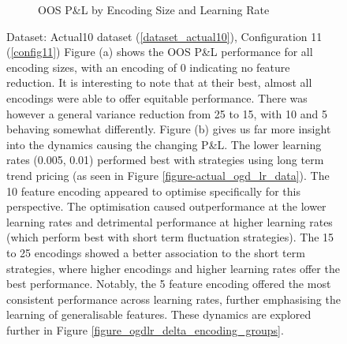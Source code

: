 \documentclass[a4paper,11pt,oneside]{article}
\theoremstyle{plain}
\theoremstyle{definition}
\begin{document}
\begin{figure}[H]
\begin{subfigure}{1.0\linewidth}
			\caption[OOS P\&L by Encoding Size and Learning Rate]{OOS P\&L by Encoding Size and Learning Rate}
		\end{subfigure}	
		\caption[OOS P\&L By Feature Selection Size and OGD Learning Rate]
		{Dataset: Actual10 dataset (\ref{dataset_actual10}), Configuration 11 (\ref{config11})		
		\newline Figure (a) shows the OOS P\&L performance for all encoding sizes, with an encoding of 0 indicating no feature reduction. It is interesting to note that at their best, almost all encodings were able to offer equitable performance. There was however a general variance reduction from 25 to 15, with 10 and 5 behaving somewhat differently. Figure (b) gives us far more insight into the dynamics causing the changing P\&L. The lower learning rates (0.005, 0.01) performed best with strategies using long term trend pricing (as seen in Figure \ref{figure-actual_ogd_lr_data}). The 10 feature encoding appeared to optimise specifically for this perspective. The optimisation caused outperformance at the lower learning rates and detrimental performance at higher learning rates (which perform best with short term fluctuation strategies). The 15 to 25 encodings showed a better association to the short term strategies, where higher encodings and higher learning rates offer the best performance. Notably, the 5 feature encoding offered the most consistent performance across learning rates, further emphasising the learning of generalisable features. These dynamics are explored further in Figure \ref{figure_ogdlr_delta_encoding_groups}.}
	\label{figure-encoding_pl_median}
	\end{figure}
		
\end{document}

